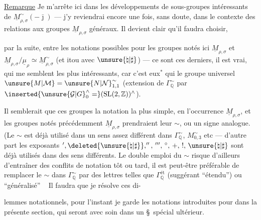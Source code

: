 \uline{Remarque} Je m'arrête ici dans les développements de sous-groupes
intéressants de $\underline M_{\rho,\sigma}^{\sim}(-\bar\jmath)$
--- j'y reviendrai encore une fois, sans doute, dans le contexte des
relations aux groupes $\underline M_{\rho,\sigma}$ généraux.
Il devient clair qu'il faudra choisir,


par la suite, entre les notations possibles
 pour les groupes notés ici
$\underline M_{\rho,\sigma}$ et
$\underline M_{\rho,\sigma}/\underline\mu_\rho\simeq
\underline M_{\rho,\sigma}^{\sim}$
(et itou avec $\unsure{\natural|\sharp}$)
--- ce sont ces derniers, il est vrai, qui me semblent les plus intéressants,
car c'est eux$^{*}$ qui  le groupe universel
$\unsure{M|\mathcal M}=\unsure{N|\mathcal N}_{1,1}^{\sim}$
(extension de $\Gamma_{\mathbb Q}^{\sim}$ par
$\inserted{\unsure{\mathcal G|G}_{0}^{\wedge}=}
(\mathrm{SL}(2,\mathbb Z))^{\wedge}$).

Il semblerait que ces groupes  la notation la plus simple,
en l'occurrence $\underline M_{\rho,\sigma}$, et les groupes notés
précédemment $\underline M_{\rho,\sigma}$ prendraient leur $\sim$,
ou un signe analogue. (Le $\sim$ est déjà utilisé dans un sens assez
différent dans $\Gamma_{\mathbb Q}^{\sim}$,
$M_{0,3}^{\sim}$ etc --- d'autre part les exposants
$',\deleted{\unsure{\natural|\sharp}},'',\,''',\,{}^{\circ},\,+,\,!,\,
\unsure{\natural|\sharp}$
sont déjà utilisés dans des sens différents.
Le double emploi du $\sim$ risque d'ailleurs d'entraîner des conflits de
notation tôt ou tard, il est peut-être préférable de remplacer le $\sim$
dans $\Gamma_{\mathbb Q}^{\sim}$ par des lettres telles que
$\Gamma_{\mathbb Q}^{\text{ét}}$
(suggérant ``étendu'') ou 
``généralisé'' \ 
Il faudra que je résolve ces di-

lemmes notationnels, pour l'instant je garde les notations introduites pour
 dans la présente section, qui seront
 avec soin dans un \S\ spécial ultérieur.

